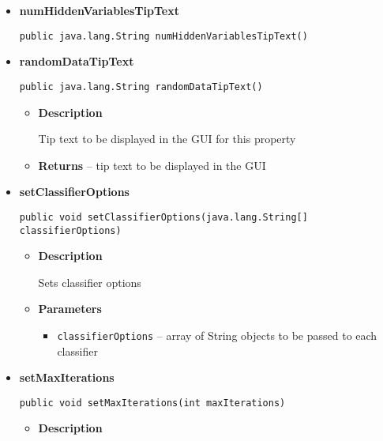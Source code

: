 \documentclass[11pt,a4paper]{report}
\begin{document}
{{{{{\begin{itemize}
{\begin{itemize}
{Retrains each of the classifiers, then attempts to impute missing data in a copy of the training data. Does not iterate again if the results of current iteration match the results of the previous iteration, or the max number of iterations has been reached.
}
\item{{\bf  Returns} -- 
true if another iteration should be performed, otherwise false. 
}%
\end{itemize}
}%
\item{ 
{\bf  numHiddenVariablesTipText}\\
\begin{lstlisting}[frame=none]
public java.lang.String numHiddenVariablesTipText()\end{lstlisting} %
}%
\item{ 
{\bf  randomDataTipText}\\
\begin{lstlisting}[frame=none]
public java.lang.String randomDataTipText()\end{lstlisting} %
\begin{itemize}
\item{
{\bf  Description}

Tip text to be displayed in the GUI for this property
}
\item{{\bf  Returns} -- 
tip text to be displayed in the GUI 
}%
\end{itemize}
}%
\item{ 
{\bf  setClassifierOptions}\\
\begin{lstlisting}[frame=none]
public void setClassifierOptions(java.lang.String[] classifierOptions)\end{lstlisting} %
\begin{itemize}
\item{
{\bf  Description}

Sets classifier options
}
\item{
{\bf  Parameters}
  \begin{itemize}
   \item{
\texttt{classifierOptions} -- array of String objects to be passed to each classifier}
  \end{itemize}
}%
\end{itemize}
}%
\item{ 
{\bf  setMaxIterations}\\
\begin{lstlisting}[frame=none]
public void setMaxIterations(int maxIterations)\end{lstlisting} %
\begin{itemize}
\item{
{\bf  Description}

}
\end{itemize}}
\end{itemize}}}}}}
\end{document}
